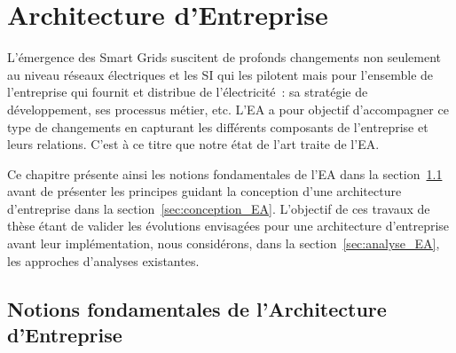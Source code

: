 \chapter{Architecture d'Entreprise}
\label{ch:EA}

\PartialToc

\vspace*{2em}
L'émergence des Smart Grids suscitent de profonds changements
non seulement au niveau réseaux électriques et les
SI qui les pilotent mais pour l'ensemble de l'entreprise qui fournit et distribue de l'électricité~:
sa stratégie de développement, ses processus métier, etc. L'EA a pour objectif d'accompagner
ce type de changements en capturant les différents composants de l'entreprise et leurs relations. C'est à ce
titre que notre état de l'art traite de l'EA.

Ce chapitre présente ainsi les notions fondamentales de l'EA dans la section~\ref{sec:notions_EA} avant 
de présenter les principes guidant la conception d'une architecture d'entreprise
dans la section~\ref{sec:conception_EA}. L'objectif de ces travaux de thèse étant de valider
les évolutions envisagées pour une architecture d'entreprise avant leur implémentation, nous
considérons, dans la section~\ref{sec:analyse_EA}, les approches
d'analyses existantes.




\section{Notions fondamentales de l'Architecture d'Entreprise}
\label{sec:notions_EA}





 
